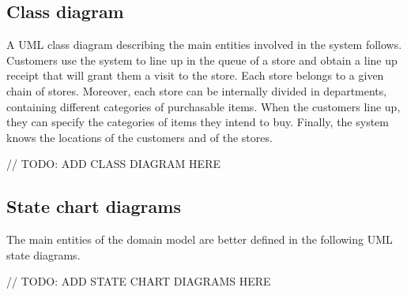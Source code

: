 \documentclass[../../main.tex]{subfiles}
\begin{document}
\subsection{Class diagram}

A UML class diagram describing the main entities involved in the system follows.
Customers use the system to line up in the queue of a store and obtain a line up
receipt that will grant them a visit to the store. Each store belongs to a given
chain of stores. Moreover, each store can be internally divided in departments,
containing different categories of purchasable items. When the customers line
up, they can specify the categories of items they intend to buy. Finally, the
system knows the locations of the customers and of the stores.

// TODO: ADD CLASS DIAGRAM HERE

\subsection{State chart diagrams}

The main entities of the domain model are better defined in the following UML
state diagrams.

// TODO: ADD STATE CHART DIAGRAMS HERE
\end{document}
